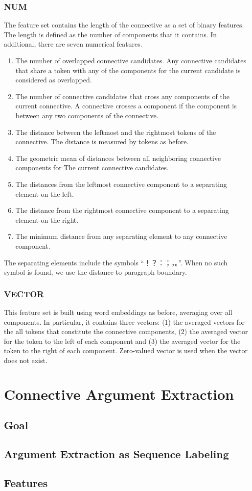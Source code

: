 \subsubsection{NUM}

The feature set contains the length of the connective as a set
of binary features. The length is defined as the number of components
that it contains.
In additional, there are seven numerical features.
\begin{enumerate}
    \item The number of overlapped connective candidates. Any connective
        candidates that share a token with any of the components for the current
        candidate is considered as overlapped.
    \item The number of connective candidates that cross any
        components of the current connective. A connective crosses a component
        if the component is between any two components of the connective.
    \item The distance between the leftmost and the rightmost tokens of the connective.
        The distance is measured by tokens as before.
    \item The geometric mean of distances between all neighboring connective components for
        The current connective candidates.
    \item The distances from the leftmost connective component to a separating element on the left.
    \item The distance from the rightmost connective component to a separating element on the right.
    \item The minimum distance from any separating element to any connective component.
\end{enumerate}

The separating elements include the symbols ``！？：；，。''.
When no such symbol is found, we use the distance to paragraph boundary.

\subsubsection{VECTOR}

This feature set is built using word embeddings as before, averaging over all components.
In particular, it contains three vectors: (1) the averaged vectors
for the all tokens that constitute the connective components, (2) the averaged vector for the
token to the left of each component and (3) the averaged vector for the token to the
right of each component. Zero-valued vector is used when the vector does not exist.

\section{Connective Argument Extraction}

\subsection{Goal}

\subsection{Argument Extraction as Sequence Labeling}

\subsection{Features}
